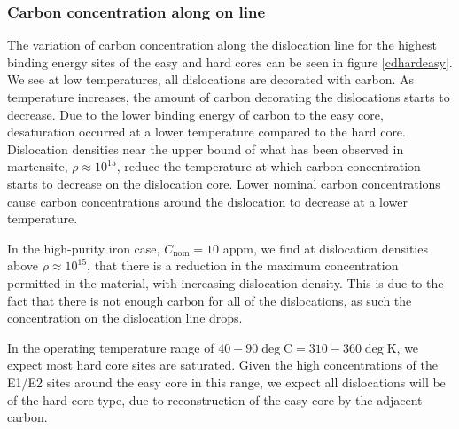 \documentclass[a4paper,11pt]{article}
\numberwithin{equation}{chapter}
\numberwithin{listing}{chapter}
\begin{document}
\subsubsection{Carbon concentration along on line}
\label{sec:org2fa09e5}

The variation of carbon concentration along the dislocation line for the highest
binding energy sites of the easy and hard cores can be seen in figure
\ref{cdhardeasy}. We see at low temperatures, all dislocations are
decorated with carbon. As temperature increases, the amount of carbon
decorating the dislocations starts to decrease. Due to the lower binding
energy of carbon to the easy core, desaturation occurred at a lower
temperature compared to the hard core. Dislocation densities near the upper
bound of what has been observed in martensite, \(\rho \approx10^{15}\), reduce
the temperature at which carbon concentration starts to decrease on the
dislocation core. Lower nominal carbon concentrations cause carbon
concentrations around the dislocation to decrease at a lower temperature.

In the high-purity iron case, \(C_{\text{nom}} = 10\) appm, we find at
dislocation densities above \(\rho \approx10^{15}\), that there is a reduction
in the maximum concentration permitted in the material, with increasing
dislocation density. This is due to the fact that there is not enough carbon
for all of the dislocations, as such the concentration on the dislocation line
drops.

In the operating temperature range of \(40-90\deg\text{C} = 310-360\deg\text{K}\), we expect most hard
core sites are saturated. Given the high concentrations of the E1/E2 sites around the easy core
in this range, we expect all dislocations will be of the hard core type, due to reconstruction of
the easy core by the adjacent carbon.
\end{document}
